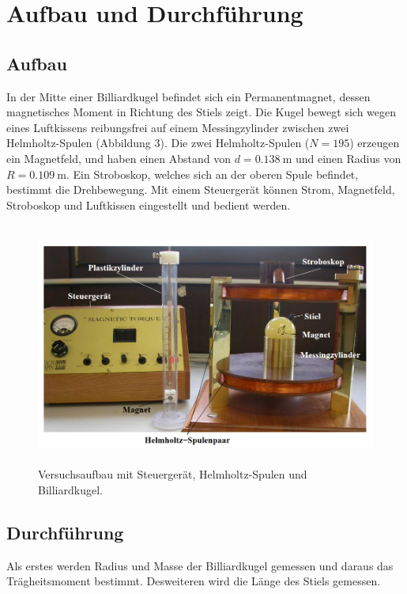 \section{Aufbau und Durchführung}
\label{sec:Durchführung}
\subsection{Aufbau}

In der Mitte einer Billiardkugel befindet sich ein Permanentmagnet, dessen magnetisches Moment in Richtung des Stiels zeigt. 
Die Kugel bewegt sich wegen eines Luftkissens reibungsfrei auf einem Messingzylinder zwischen zwei Helmholtz-Spulen (Abbildung 3).  
Die zwei Helmholtz-Spulen ($N=195$) erzeugen ein Magnetfeld, und haben einen Abstand von $d=\SI{0.138}{\meter}$ und einen Radius von $R=\SI{0.109}{\meter}$.
Ein Stroboskop, welches sich an der oberen Spule befindet, bestimmt die Drehbewegung.
Mit einem Steuergerät können Strom, Magnetfeld, Stroboskop und Luftkissen eingestellt und bedient werden.

\begin{figure}[H]
  \centering
  \includegraphics[height=8cm]{Screenshot (3).png}
  \caption{Versuchsaufbau mit Steuergerät, Helmholtz-Spulen und Billiardkugel. \cite[S. 2]{kent}}
  \label{fig:drill}
\end{figure}


\subsection{Durchführung}
Als erstes werden Radius und Masse der Billiardkugel gemessen und daraus das Trägheitsmoment bestimmt. Desweiteren wird die Länge des Stiels gemessen.

